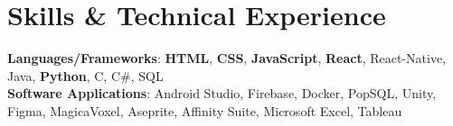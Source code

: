 \documentclass[letterpaper,11pt]{article}
\begin{document}
\section{Skills \& Technical Experience}
\begin{itemize}[leftmargin=0.15in, label={}]
  \small{\item{
  \vspace{1mm}
    \textbf{Languages/Frameworks}{: \textbf{HTML}, \textbf{CSS}, \textbf{JavaScript}, \textbf{React}, React-Native, Java, \textbf{Python}, C, C\#, SQL} \\
    \vspace{1mm}
    \textbf{Software Applications}{: Android Studio, Firebase, Docker, PopSQL, Unity, Figma, MagicaVoxel, Aseprite, Affinity Suite, Microsoft Excel, Tableau} \\
  }}
\end{itemize}





\end{document}
